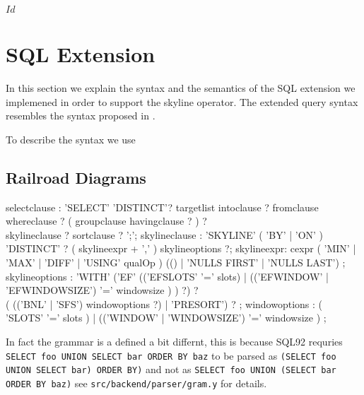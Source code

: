 
\svnInfo $Id$

\section{SQL Extension}

In this section we explain the syntax and the semantics of the SQL
extension we implemened in order to support the skyline operator. The
extended query syntax resembles the syntax proposed in
\citep{Borzsonyi2001}.

To describe the syntax we use 
\subsection{Railroad Diagrams}


\railtermfont{\ttfamily\upshape\tiny}
\railboxheight 12pt
\railinit

\begin{rail}

selectclause : 'SELECT' 'DISTINCT'? targetlist intoclause ? fromclause \\ whereclause ? ( groupclause havingclause ? ) ? \\ skylineclause ? sortclause ? ';';
skylineclause : 'SKYLINE' ( 'BY' | 'ON' ) 'DISTINCT' ? ( skylineexpr + ',' ) skylineoptions ?;
skylineexpr: cexpr ( 'MIN' | 'MAX' | 'DIFF' | 'USING' qualOp ) (() | 'NULLS FIRST' | 'NULLS LAST') ;
skylineoptions : 'WITH' ('EF' (('EFSLOTS' '=' slots) | (('EFWINDOW' | 'EFWINDOWSIZE') '=' windowsize ) ) ?) ? \\ ( (('BNL' | 'SFS') windowoptions ?) | 'PRESORT') ? ;
windowoptions : ( 'SLOTS' '=' slots ) | (('WINDOW' | 'WINDOWSIZE') '=' windowsize ) ;

\end{rail}


\newcommand\inlinesql[1]{{\tt #1}}
\newcommand\sql[1]{\inlinesql{#1}}
\newcommand\srcref[1]{{\tt #1}}

In fact the grammar is a defined a bit differnt, this is because SQL92
 requries
\sql{SELECT foo UNION SELECT bar ORDER BY baz}
to be parsed as 
\sql{(SELECT foo UNION SELECT bar) ORDER BY)}
and not as
\sql{SELECT foo UNION (SELECT bar ORDER BY baz)}
see \srcref{src/backend/parser/gram.y} for details.

